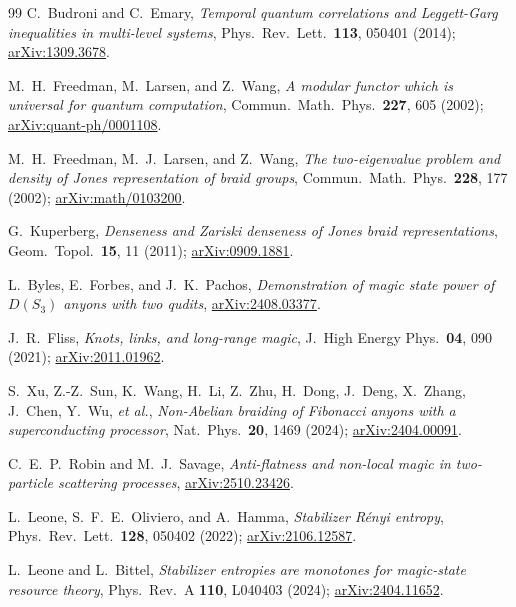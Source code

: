 \documentclass[aps,pra,twocolumn,superscriptaddress,longbibliography,floatfix,nofootinbib]{revtex4-2}
\begin{document}
\begin{thebibliography}{99}
C.~Budroni and C.~Emary,
\emph{Temporal quantum correlations and Leggett-Garg inequalities in
multi-level systems},
Phys.\ Rev.\ Lett.\ \textbf{113}, 050401 (2014);
\href{https://arxiv.org/abs/1309.3678}{arXiv:1309.3678}.

M.~H.~Freedman, M.~Larsen, and Z.~Wang,
\emph{A modular functor which is universal for quantum computation},
Commun.\ Math.\ Phys.\ \textbf{227}, 605 (2002);
\href{https://arxiv.org/abs/quant-ph/0001108}{arXiv:quant-ph/0001108}.

M.~H.~Freedman, M.~J.~Larsen, and Z.~Wang,
\emph{The two-eigenvalue problem and density of Jones representation
of braid groups},
Commun.\ Math.\ Phys.\ \textbf{228}, 177 (2002);
\href{https://arxiv.org/abs/math/0103200}{arXiv:math/0103200}.

G.~Kuperberg,
\emph{Denseness and Zariski denseness of Jones braid representations},
Geom.\ Topol.\ \textbf{15}, 11 (2011);
\href{https://arxiv.org/abs/0909.1881}{arXiv:0909.1881}.

L.~Byles, E.~Forbes, and J.~K.~Pachos,
\emph{Demonstration of magic state power of $D(S_3)$ anyons with two
qudits},
\href{https://arxiv.org/abs/2408.03377}{arXiv:2408.03377}.

J.~R.~Fliss,
\emph{Knots, links, and long-range magic},
J.\ High Energy Phys.\ \textbf{04}, 090 (2021);
\href{https://arxiv.org/abs/2011.01962}{arXiv:2011.01962}.

S.~Xu, Z.-Z.~Sun, K.~Wang, H.~Li, Z.~Zhu, H.~Dong, J.~Deng, X.~Zhang, J.~Chen,
Y.~Wu, \emph{et al.},
\emph{Non-Abelian braiding of Fibonacci anyons with a superconducting
processor},
Nat.\ Phys.\ \textbf{20}, 1469 (2024);
\href{https://arxiv.org/abs/2404.00091}{arXiv:2404.00091}.

C.~E.~P.~Robin and M.~J.~Savage,
\emph{Anti-flatness and non-local magic in two-particle scattering
processes},
\href{https://arxiv.org/abs/2510.23426}{arXiv:2510.23426}.

L.~Leone, S.~F.~E.~Oliviero, and A.~Hamma,
\emph{Stabilizer Rényi entropy},
Phys.\ Rev.\ Lett.\ \textbf{128}, 050402 (2022);
\href{https://arxiv.org/abs/2106.12587}{arXiv:2106.12587}.

L.~Leone and L.~Bittel,
\emph{Stabilizer entropies are monotones for magic-state resource
theory},
Phys.\ Rev.\ A \textbf{110}, L040403 (2024);
\href{https://arxiv.org/abs/2404.11652}{arXiv:2404.11652}.


\end{thebibliography}
\end{document}
